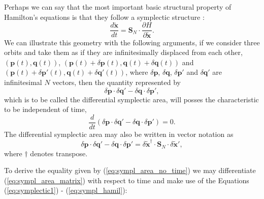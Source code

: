 Perhaps we can say that the most important basic structural property of Hamilton's equations is that they follow a symplectic structure \cite{ott_chaos_2002}:
\begin{equation}
\frac{d\tilde{\bm{x}}}{dt}=\bm{S}_N\cdot \frac{\partial H}{\partial \tilde{\bm{x}}}.
\end{equation}
We can illustrate this geometry with the following arguments, if we consider three orbits and take them as if they are infinitesimally displaced from each other, $(\bm{p}(t),\bm{q}(t))$, $(\bm{p}(t)+\delta \bm{p}(t),\bm{q}(t)+\delta \bm{q}(t))$ and $(\bm{p}(t)+\delta \bm{p}'(t),\bm{q}(t)+\delta \bm{q}'(t))$, where $\delta \bm{p}$, $\delta \bm{q}$, $\delta \bm{p}'$ and $\delta \bm{q}'$ are infinitesimal $N$ vectors, then the quantity represented by
\begin{equation}
\delta \bm{p}\cdot \delta \bm{q}'-\delta \bm{q}\cdot \delta \bm{p}',
\end{equation}
which is to be called the differential symplectic area, will posses the characteristic to be independent of time,
\begin{equation}
\frac{d}{dt}(\delta\bm{p}\cdot\delta\bm{q}'-\delta\bm{q}\cdot\delta\bm{p}')=0.
\label{eq:sympl_area_no_time}
\end{equation}
The differential symplectic area may also be written in vector notation as
\begin{equation}
\delta\bm{p}\cdot\delta\bm{q}'-\delta\bm{q}\cdot\delta\bm{p}'=\delta\tilde{\bm{x}}^{\dagger}\cdot\bm{S}_N\cdot \delta \tilde{\bm{x}}',
\label{eq:sympl_area_matrix}
\end{equation}
where $\dagger$ denotes transpose.\par

To derive the equality given by (\ref{eq:sympl_area_no_time}) we may differentiate (\ref{eq:sympl_area_matrix}) with respect to time and make use of the Equations (\ref{eq:symplectic1}) - (\ref{eq:sympl_hamil}):


